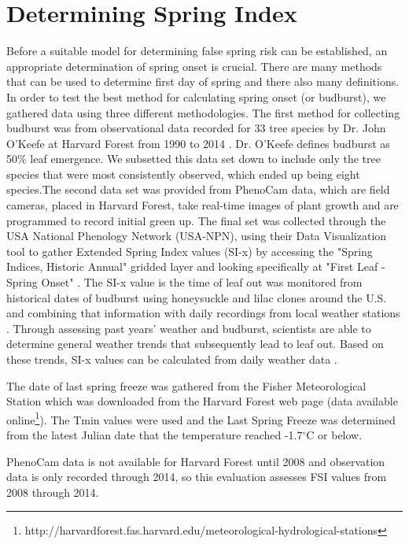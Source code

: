 \documentclass{article}\usepackage[]{graphicx}\usepackage[]{color}
\begin{document}
\section{Determining Spring Index}
Before a suitable model for determining false spring risk can be established, an appropriate determination of spring onset is crucial. There are many methods that can be used to determine first day of spring and there also many definitions. In order to test the best method for calculating spring onset (or budburst), we gathered data using three different methodologies. The first method for collecting budburst was from observational data recorded for 33 tree species by Dr. John O'Keefe at Harvard Forest from 1990 to 2014 \citep{OKeefe2014}. 
Dr. O'Keefe defines budburst as 50\% leaf emergence. We subsetted this data set down to include only the tree species that were most consistently observed, which ended up being eight species.The second data set was provided from PhenoCam data, which are field cameras, placed in Harvard Forest, take real-time images of plant growth and are programmed to record initial green up. The final set was collected through the USA National Phenology Network (USA-NPN), using their Data Visualization tool to gather Extended Spring Index values (SI-x) by accessing the "Spring Indices, Historic Annual" gridded layer and looking specifically at "First Leaf - Spring Onset" \citep{SI-x2016}. The SI-x value is the time of leaf out was monitored from historical dates of budburst using honeysuckle and lilac clones around the U.S. and combining that information with daily recordings from local weather stations \citep{USA-NPN2016, Ault2015, Ault2015a, Schwartz2013, Schwartz1997}. 
Through assessing past years' weather and budburst, scientists are able to determine general weather trends that subsequently lead to leaf out. Based on these trends, SI-x values can be calculated from daily weather data \citep{USA-NPN2016}.
\par
The date of last spring freeze was gathered from the Fisher Meteorological Station which was downloaded from the Harvard Forest web page (data available online\footnote{http://harvardforest.fas.harvard.edu/meteorological-hydrological-stations}). The Tmin values were used and the Last Spring Freeze was  determined from the latest Julian date that the temperature reached -1.7$^{\circ}$C or below. 
\par
PhenoCam data is not available for Harvard Forest until 2008 and observation data is only recorded through 2014, so this evaluation assesses FSI values from 2008 through 2014.
\end{document}
